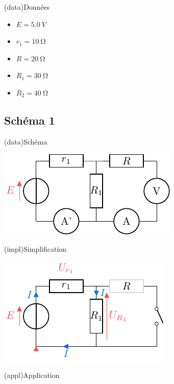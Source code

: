 \documentclass[../../main/main.tex]{subfiles}
\begin{document}
{\begin{tcbraster}[raster columns=2, raster equal height=rows]
\begin{tcb}
\begin{center}
        \end{center}
    \end{tcb}
    \begin{tcb}[sidebyside](data){Données}
        \begin{itemize}
            \item $E   = \SI{5.0}{V}$
            \item $r_1 = \SI{10}{\ohm}$
            \item $R   = \SI{20}{\ohm}$
        \end{itemize}
        \tcblower
        \begin{itemize}
            \item $R_1 = \SI{30}{\ohm}$
            \item $R_2 = \SI{40}{\ohm}$
        \end{itemize}
    \end{tcb}
\end{tcbraster}
\subsection{Schéma 1}
\begin{tcbraster}[raster columns=3, raster equal height=rows]
    \begin{tcb}(data){Schéma}
        \begin{center}
            \hspace*{-12pt}
            \includegraphics{mes_iu_a}
        \end{center}
    \end{tcb}
    \begin{tcb}(impl){Simplification}
        \begin{center}
            \hspace*{-12pt}
            \includegraphics{mes_iu_a-simple}
        \end{center}
    \end{tcb}
    \begin{tcb}(appl){Application}


\end{tcb}
\end{tcbraster}}
\end{document}
